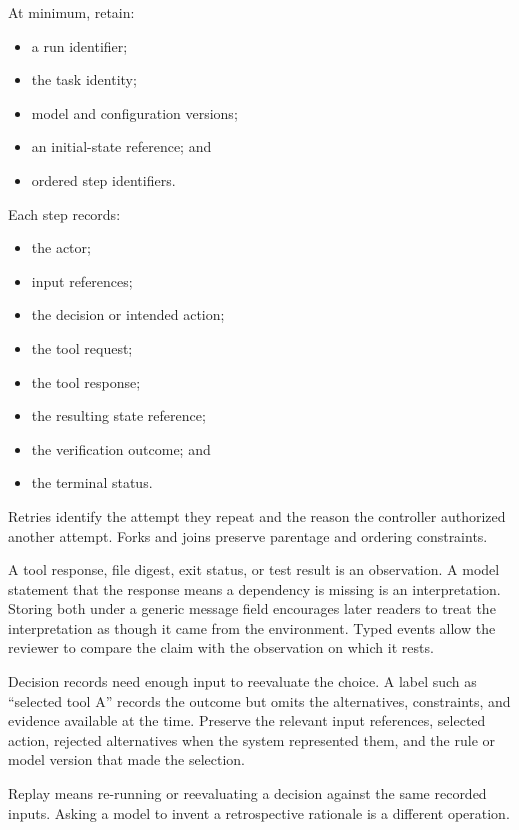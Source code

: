 
At minimum, retain:

\begin{itemize}
\tightlist
\item
  a run identifier;
\item
  the task identity;
\item
  model and configuration versions;
\item
  an initial-state reference; and
\item
  ordered step identifiers.
\end{itemize}


Each step records:

\begin{itemize}
\tightlist
\item
  the actor;
\item
  input references;
\item
  the decision or intended action;
\item
  the tool request;
\item
  the tool response;
\item
  the resulting state reference;
\item
  the verification outcome; and
\item
  the terminal status.
\end{itemize}

Retries identify the attempt they repeat and the reason the controller authorized another attempt. Forks and joins preserve parentage and ordering constraints.

A tool response, file digest, exit status, or test result is an observation. A model statement that the response means a dependency is missing is an interpretation. Storing both under a generic message field encourages later readers to treat the interpretation as though it came from the environment. Typed events allow the reviewer to compare the claim with the observation on which it rests.

Decision records need enough input to reevaluate the choice. A label such as ``selected tool A'' records the outcome but omits the alternatives, constraints, and evidence available at the time. Preserve the relevant input references, selected action, rejected alternatives when the system represented them, and the rule or model version that made the selection.

Replay means re-running or reevaluating a decision against the same recorded inputs. Asking a model to invent a retrospective rationale is a different operation.

